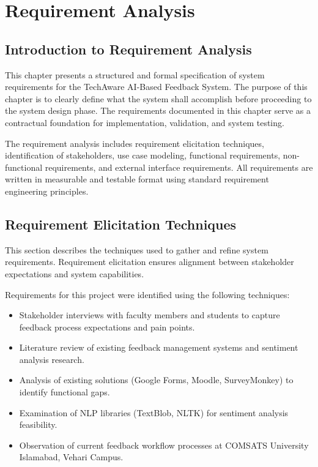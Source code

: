 
\chapter{Requirement Analysis}

\section{Introduction to Requirement Analysis}

This chapter presents a structured and formal specification of system requirements for the TechAware AI-Based Feedback System. The purpose of this chapter is to clearly define what the system shall accomplish before proceeding to the system design phase. The requirements documented in this chapter serve as a contractual foundation for implementation, validation, and system testing.

The requirement analysis includes requirement elicitation techniques, identification of stakeholders, use case modeling, functional requirements, non-functional requirements, and external interface requirements. All requirements are written in measurable and testable format using standard requirement engineering principles.


\section{Requirement Elicitation Techniques}

This section describes the techniques used to gather and refine system requirements. Requirement elicitation ensures alignment between stakeholder expectations and system capabilities.

Requirements for this project were identified using the following techniques:

\begin{itemize}
    \item Stakeholder interviews with faculty members and students to capture feedback process expectations and pain points.
    \item Literature review of existing feedback management systems and sentiment analysis research.
    \item Analysis of existing solutions (Google Forms, Moodle, SurveyMonkey) to identify functional gaps.
    \item Examination of NLP libraries (TextBlob, NLTK) for sentiment analysis feasibility.
    \item Observation of current feedback workflow processes at COMSATS University Islamabad, Vehari Campus.
\end{itemize}


